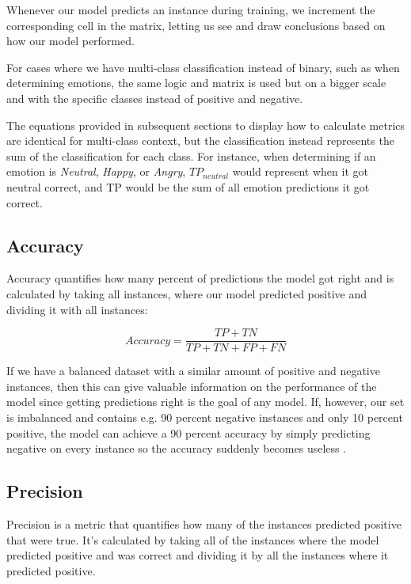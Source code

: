 \documentclass[nofilelist]{cslthse-msc}
\begin{document}
Whenever our model predicts an instance during training, we increment the corresponding cell in the matrix, letting us see and draw conclusions based on how our model performed. 


For cases where we have multi-class classification instead of binary, such as when determining emotions, the same logic and matrix is used but on a bigger scale and with the specific classes instead of positive and negative. 

The equations provided in subsequent sections to display how to calculate metrics are identical for multi-class context, but the classification instead represents the sum of the classification for each class. For instance, when determining if an emotion is \textit{Neutral}, \textit{Happy}, or \textit{Angry}, $TP_{neutral}$ would represent when it got neutral correct, and TP would be the sum of all emotion predictions it got correct.  









\subsection{Accuracy}
Accuracy quantifies how many percent of predictions the model got right and is calculated by taking all instances, where our model predicted positive and dividing it with all instances:

$$ Accuracy = \frac{TP + TN}{TP + TN + FP + FN}$$

If we have a balanced dataset with a similar amount of positive and negative instances, then this can give valuable information on the performance of the model since getting predictions right is the goal of any model. If, however, our set is imbalanced and contains e.g. 90 percent negative instances and only 10 percent positive, the model can achieve a 90 percent accuracy by simply predicting negative on every instance so the accuracy suddenly becomes useless \citep{imbalancedlearning}. 

\subsection{Precision}
Precision is a metric that quantifies how many of the instances predicted positive that were true. It's calculated by taking all of the instances where the model predicted positive and was correct and dividing it by all the instances where it predicted positive.
\end{document}
